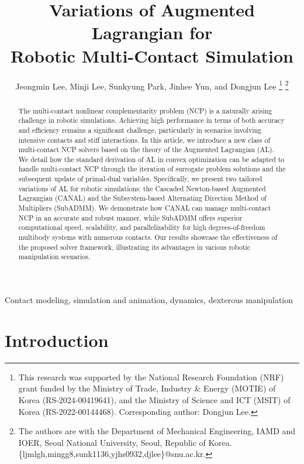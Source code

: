 \documentclass[lettersize,journal]{IEEEtran}
\begin{document}
\title{
Variations of Augmented Lagrangian for \\ Robotic Multi-Contact Simulation
}
\author{Jeongmin Lee, Minji Lee, Sunkyung Park, Jinhee Yun, and Dongjun Lee
\thanks{This research was supported by the National Research Foundation (NRF) grant funded by the Ministry of Trade, Industry \& Energy (MOTIE) of Korea (RS-2024-00419641), and the Ministry of Science and ICT (MSIT) of Korea (RS-2022-00144468). Corresponding author: Dongjun Lee.
}
\thanks{The authors are with the Department of Mechanical Engineering, IAMD and IOER, Seoul National University, Seoul, Republic of Korea.
\{ljmlgh,mingg8,sunk1136,yjhs0932,djlee\}@snu.ac.kr. }
}
\maketitle

\begin{abstract}
The multi-contact nonlinear complementarity problem (NCP) is a naturally arising challenge in robotic simulations.
Achieving high performance in terms of both accuracy and efficiency remains a significant challenge, particularly in scenarios involving intensive contacts and stiff interactions. 
In this article, we introduce a new class of multi-contact NCP solvers based on the theory of the Augmented Lagrangian (AL). We detail how the standard derivation of AL in convex optimization can be adapted to handle multi-contact NCP through the iteration of surrogate problem solutions and the subsequent update of primal-dual variables. 
Specifically, we present two tailored variations of AL for robotic simulations: the Cascaded Newton-based Augmented Lagrangian (CANAL) and the Subsystem-based Alternating Direction Method of Multipliers (SubADMM). We demonstrate how CANAL can manage multi-contact NCP in an accurate and robust manner, while SubADMM offers superior computational speed, scalability, and parallelizability for high degrees-of-freedom multibody systems with numerous contacts. Our results showcase the effectiveness of the proposed solver framework, illustrating its advantages in various robotic manipulation scenarios.
\end{abstract}

\begin{IEEEkeywords}
Contact modeling, simulation and animation, dynamics, dexterous manipulation
\end{IEEEkeywords}


\section{Introduction}
\end{document}
